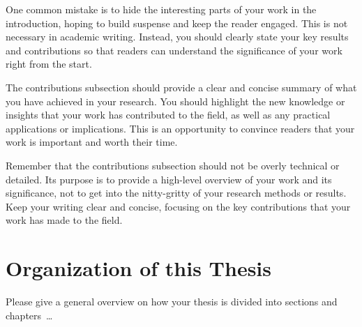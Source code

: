 One common mistake is to hide the interesting parts of your work in the introduction, hoping to build suspense and keep the reader engaged. This is not necessary in academic writing. Instead, you should clearly state your key results and contributions so that readers can understand the significance of your work right from the start.

The contributions subsection should provide a clear and concise summary of what you have achieved in your research. You should highlight the new knowledge or insights that your work has contributed to the field, as well as any practical applications or implications. This is an opportunity to convince readers that your work is important and worth their time.

Remember that the contributions subsection should not be overly technical or detailed. Its purpose is to provide a high-level overview of your work and its significance, not to get into the nitty-gritty of your research methods or results. Keep your writing clear and concise, focusing on the key contributions that your work has made to the field.

\section{Organization of this Thesis}
Please give a general overview on how your thesis is divided into sections and chapters~\dots

